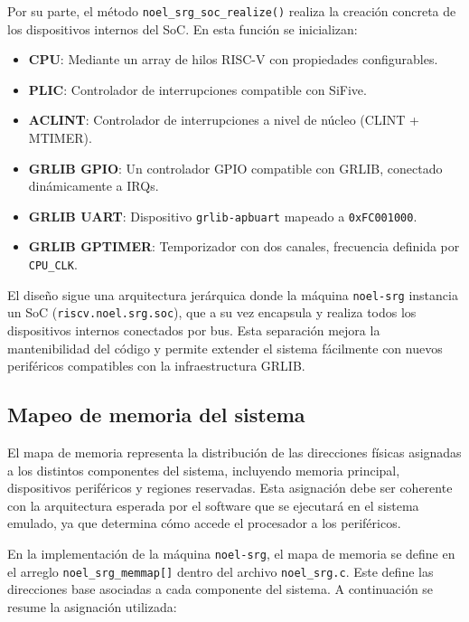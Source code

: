 Por su parte, el método \texttt{noel\_srg\_soc\_realize()} realiza la creación concreta de los dispositivos internos del SoC. En esta función se inicializan:

\begin{itemize}
    \item \textbf{CPU}: Mediante un array de hilos RISC-V con propiedades configurables.
    \item \textbf{PLIC}: Controlador de interrupciones compatible con SiFive.
    \item \textbf{ACLINT}: Controlador de interrupciones a nivel de núcleo (CLINT + MTIMER).
    \item \textbf{GRLIB GPIO}: Un controlador GPIO compatible con GRLIB, conectado dinámicamente a IRQs.
    \item \textbf{GRLIB UART}: Dispositivo \texttt{grlib-apbuart} mapeado a \texttt{0xFC001000}.
    \item \textbf{GRLIB GPTIMER}: Temporizador con dos canales, frecuencia definida por \texttt{CPU\_CLK}.
\end{itemize}

El diseño sigue una arquitectura jerárquica donde la máquina \texttt{noel-srg} instancia un SoC (\texttt{riscv.noel.srg.soc}), que a su vez encapsula y realiza todos los dispositivos internos conectados por bus. Esta separación mejora la mantenibilidad del código y permite extender el sistema fácilmente con nuevos periféricos compatibles con la infraestructura GRLIB.

\subsection{Mapeo de memoria del sistema}
\label{subsec:mapeo-memoria-noel}

El mapa de memoria representa la distribución de las direcciones físicas asignadas a los distintos componentes del sistema, incluyendo memoria principal, dispositivos periféricos y regiones reservadas. Esta asignación debe ser coherente con la arquitectura esperada por el software que se ejecutará en el sistema emulado, ya que determina cómo accede el procesador a los periféricos.

En la implementación de la máquina \texttt{noel-srg}, el mapa de memoria se define en el arreglo \texttt{noel\_srg\_memmap[]} dentro del archivo \texttt{noel\_srg.c}. Este define las direcciones base asociadas a cada componente del sistema. A continuación se resume la asignación utilizada:

